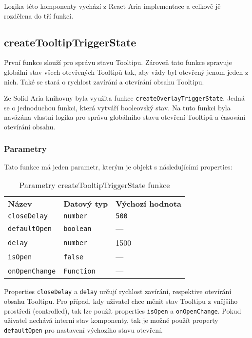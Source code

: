 Logika této komponenty vychází z React Aria implementace a celkově jě rozdělena do tří funkcí.

\clearpage

\subsection{createTooltipTriggerState}

První funkce slouží pro správu stavu Tooltipu.
Zároveň tato funkce spravuje globální stav všech otevřených Tooltipů tak, aby vždy byl otevřený jenom jeden z nich.
Také se stará o rychlost zavírání a otevírání obsahu Tooltipu.

Ze Solid Aria knihovny byla využita funkce \texttt{createOverlayTriggerState}.
Jedná se o jednoduchou funkci, která vytváří booleovský stav.
Na tuto funkci byla navázána vlastní logika pro správu globálního stavu otevření Tooltipů a časování otevírání obsahu.

\subsubsection{Parametry}

Tato funkce má jeden parametr, kterým je objekt s následujícími properties:

\begin{table}[ht]\label{table:tooltip-trigger-state-params}
    \begin{ctucolortab}
        \begin{tabularx}{\textwidth}{X X X}
            \bfseries Název       & \bfseries Datový typ & \bfseries Výchozí hodnota \\\Midrule{}
            \texttt{closeDelay}   & \texttt{number}      & \texttt{500}              \\
            \texttt{defaultOpen}  & \texttt{boolean}     & ---                       \\
            \texttt{delay}        & \texttt{number}      & 1500                      \\
            \texttt{isOpen}       & \texttt{false}       & ---                       \\
            \texttt{onOpenChange} & \texttt{Function}    & ---
        \end{tabularx}
    \end{ctucolortab}
    \caption{Parametry createTooltipTriggerState funkce}
\end{table}

Properties \texttt{closeDelay} a \texttt{delay} určují rychlost zavírání, respektive otevírání obsahu Tooltipu.
Pro případ, kdy uživatel chce měnit stav Tooltipu z vnějšího prostředí (controlled), tak lze použít properties \texttt{isOpen} a \texttt{onOpenChange}.
Pokud uživatel nechává interní stav komponenty, tak je možné použít property \texttt{defaultOpen} pro nastavení výchozího stavu otevření.

